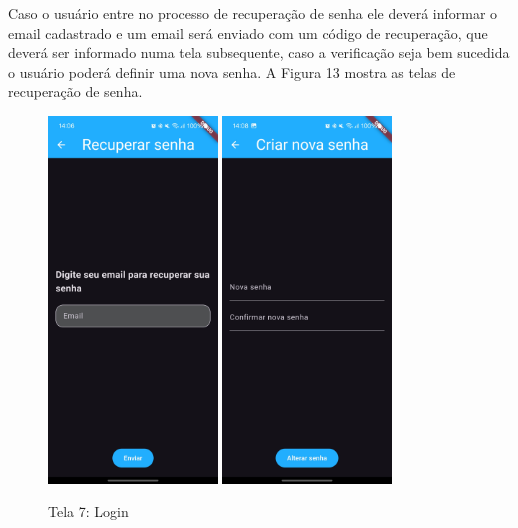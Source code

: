     Caso o usuário entre no processo de recuperação de senha ele deverá informar o email cadastrado e um email será enviado com um código de recuperação, que deverá ser informado numa tela subsequente, caso a verificação seja bem sucedida o usuário poderá definir uma nova senha. A Figura 13 mostra as telas de recuperação de senha.
    
    \FloatBarrier

    \begin{figure}[h]
        \centering
        \includegraphics[width=0.4\textwidth]{imagens/email.jpg} %
        \hspace{10mm}
        \includegraphics[width=0.4\textwidth]{imagens/nova-senha.jpg} %
        \caption{\scriptsize Tela 7: Login}
        \label{fig:tela7-recuperacao}
    \end{figure}

    \FloatBarrier